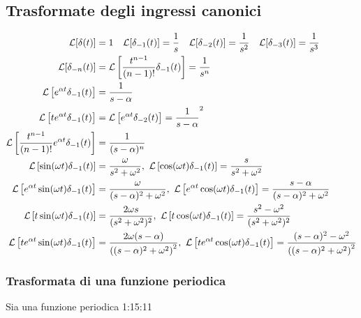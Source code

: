 \subsection{Trasformate degli ingressi canonici}
$$\begin{aligned}
\mathcal{L}[\delta(t)] &= 1 \quad
\mathcal{L}[\delta_{-1}(t)] = \frac{1}{s}\quad
\mathcal{L}[\delta_{-2}(t)] = \frac{1}{s^2}\quad
\mathcal{L}[\delta_{-3}(t)] = \frac{1}{s^3} \\
\mathcal{L}[\delta_{-n}(t)] &= \mathcal{L}\left[\frac{t^{n-1}}{(n-1)!}\delta_{-1}(t)\right] =
\frac{1}{s^n}\\
\mathcal{L}\left[e^{\alpha t}\delta_{-1}(t)\right] &= \frac{1}{s-\alpha}\\
\mathcal{L}\left[te^{\alpha t}\delta_{-1}(t)\right] &=
\mathcal{L} \left[e^{\alpha t}\delta_{-2}(t)\right] =
\frac{1}{s-\alpha}^2\\
\mathcal{L}\left[\frac{t^{n-1}}{(n-1)!}e^{\alpha t} \delta_{-1}(t)\right] &=
\frac{1}{(s-\alpha)^n} \\
\mathcal{L}\left[\sin(\omega t)\delta_{-1}(t)\right] &= \frac{\omega}{s^2+\omega^2},\
\mathcal{L}\left[\cos(\omega t)\delta_{-1}(t)\right] = \frac{s}{s^2+\omega^2}\\
\mathcal{L}\left[e^{\alpha t}\sin(\omega t) \delta_{-1}(t)\right] &=
\frac{\omega}{(s-\alpha)^2+\omega^2},\ \mathcal{L}\left[e^{\alpha t}\cos(\omega
t)\delta_{-1}(t)\right] = \frac{s-\alpha}{(s-\alpha)^2+\omega^2}\\
\mathcal{L}\left[t\sin(\omega t)\delta_{-1}(t)\right] & = \frac{2\omega
s}{(s^2+\omega^2)^2},\  \mathcal{L}\left[t\cos(\omega t)\delta_{-1}(t)\right] =
\frac{s^2-\omega^2}{(s^2+\omega^2)^2}\\
\mathcal{L}\left[te^{\alpha t}\sin(\omega t) \delta_{-1}(t)\right] & =
\frac{2\omega(s-\alpha)}{\left((s-\alpha)^2+\omega^2\right)^2},\
\mathcal{L}\left[te^{\alpha t}\cos(\omega t) \delta_{-1}(t)\right] =
\frac{(s-\alpha)^2-\omega^2}{\left((s-\alpha)^2+\omega^2\right)^2}
\end{aligned}
$$

\subsubsection{Trasformata di una funzione periodica}
Sia una funzione periodica 1:15:11

